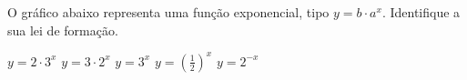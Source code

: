 O gráfico abaixo representa uma função exponencial, tipo $y=b\cdot a^x$. Identifique a sua lei de formação.

\parbox{0.4\linewidth}{

$y=2\cdot 3^x$
$y=3\cdot 2^x$
$y=3^x$
$y=\left(\frac{1}{2}\right)^x$
$y=2^{-x}$

}\parbox{0.6\linewidth}{
}


